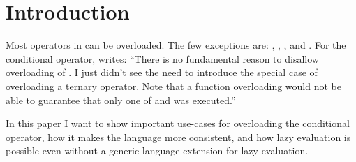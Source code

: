 \section{Introduction}
Most operators in \CC{} can be overloaded.
The few exceptions are: , \code{::}, , and .
For the conditional operator, \textcite{StrFaq} writes:
“There is no fundamental reason to disallow overloading of .
I just didn't see the need to introduce the special case of overloading a ternary operator.
Note that a function overloading  would not be able to guarantee that only one of  and  was executed.”

In this paper I want to show important use-cases for overloading the conditional operator, how it makes the language more consistent, and how lazy evaluation is possible even without a generic language extension for lazy evaluation.
